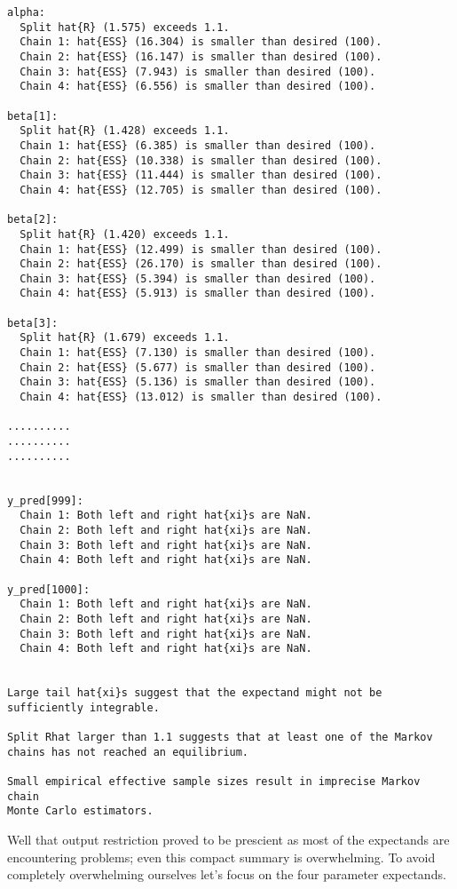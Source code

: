 \documentclass[
  letterpaper,
  DIV=11,
  numbers=noendperiod]{scrartcl}
\begin{document}
\begin{verbatim}
alpha:
  Split hat{R} (1.575) exceeds 1.1.
  Chain 1: hat{ESS} (16.304) is smaller than desired (100).
  Chain 2: hat{ESS} (16.147) is smaller than desired (100).
  Chain 3: hat{ESS} (7.943) is smaller than desired (100).
  Chain 4: hat{ESS} (6.556) is smaller than desired (100).

beta[1]:
  Split hat{R} (1.428) exceeds 1.1.
  Chain 1: hat{ESS} (6.385) is smaller than desired (100).
  Chain 2: hat{ESS} (10.338) is smaller than desired (100).
  Chain 3: hat{ESS} (11.444) is smaller than desired (100).
  Chain 4: hat{ESS} (12.705) is smaller than desired (100).

beta[2]:
  Split hat{R} (1.420) exceeds 1.1.
  Chain 1: hat{ESS} (12.499) is smaller than desired (100).
  Chain 2: hat{ESS} (26.170) is smaller than desired (100).
  Chain 3: hat{ESS} (5.394) is smaller than desired (100).
  Chain 4: hat{ESS} (5.913) is smaller than desired (100).

beta[3]:
  Split hat{R} (1.679) exceeds 1.1.
  Chain 1: hat{ESS} (7.130) is smaller than desired (100).
  Chain 2: hat{ESS} (5.677) is smaller than desired (100).
  Chain 3: hat{ESS} (5.136) is smaller than desired (100).
  Chain 4: hat{ESS} (13.012) is smaller than desired (100).

..........
..........
..........


y_pred[999]:
  Chain 1: Both left and right hat{xi}s are NaN.
  Chain 2: Both left and right hat{xi}s are NaN.
  Chain 3: Both left and right hat{xi}s are NaN.
  Chain 4: Both left and right hat{xi}s are NaN.

y_pred[1000]:
  Chain 1: Both left and right hat{xi}s are NaN.
  Chain 2: Both left and right hat{xi}s are NaN.
  Chain 3: Both left and right hat{xi}s are NaN.
  Chain 4: Both left and right hat{xi}s are NaN.


Large tail hat{xi}s suggest that the expectand might not be
sufficiently integrable.

Split Rhat larger than 1.1 suggests that at least one of the Markov
chains has not reached an equilibrium.

Small empirical effective sample sizes result in imprecise Markov chain
Monte Carlo estimators.
\end{verbatim}

Well that output restriction proved to be prescient as most of the
expectands are encountering problems; even this compact summary is
overwhelming. To avoid completely overwhelming ourselves let's focus on
the four parameter expectands.
\end{document}
